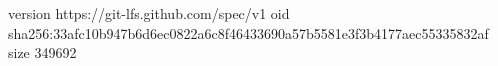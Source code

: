 version https://git-lfs.github.com/spec/v1
oid sha256:33afc10b947b6d6ec0822a6c8f46433690a57b5581e3f3b4177aec55335832af
size 349692
